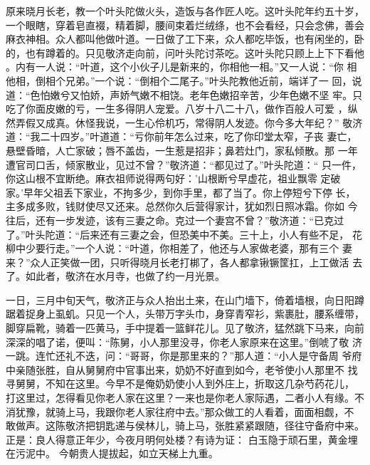原来晓月长老，教一个叶头陀做火头，造饭与各作匠人吃。这叶头陀年约五十岁，
一个眼瞎，穿着皂直裰，精着脚，腰间束着烂绒绦，也不会看经，只会念佛，善会
麻衣神相。众人都叫他做叶道。一日做了工下来，众人都吃毕饭，也有闲坐的，卧
的，也有蹲着的。只见敬济走向前，问叶头陀讨茶吃。这叶头陀只顾上上下下看他
。内有一人说：“叶道，这个小伙子儿是新来的，你相他一相。”又一人说：“你
相他相，倒相个兄弟。”一个说：“倒相个二尾子。”叶头陀教他近前，端详了一
回，说道：“色怕嫩兮又怕娇，声娇气嫩不相饶。老年色嫩招辛苦，少年色嫩不坚
牢。只吃了你面皮嫩的亏，一生多得阴人宠爱。八岁十八二十八，做作百般人可爱
，纵然弄假又成真。休怪我说，一生心伶机巧，常得阴人发迹。你今多大年纪？”
敬济道：“我二十四岁。”叶道道：“亏你前年怎么过来，吃了你印堂太窄，子丧
妻亡，悬壁昏暗，人亡家破；唇不盖齿，一生惹是招非；鼻若灶门，家私倾散。那
一年遭官司口舌，倾家散业，见过不曾？”敬济道：“都见过了。”叶头陀道：“
只一件，你这山根不宜断绝。麻衣祖师说得两句好：'山根断兮早虚花，祖业飘零
定破家。'早年父祖丢下家业，不拘多少，到你手里，都了当了。你上停短兮下停
长，主多成多败，钱财使尽又还来。总然你久后营得家计，犹如烈日照冰霜。你如
今往后，还有一步发迹，该有三妻之命。克过一个妻宫不曾？”敬济道：“已克过
了。”叶头陀道：“后来还有三妻之会，但恐美中不美。三十上，小人有些不足，
花柳中少要行走。”一个人说：“叶道，你相差了，他还与人家做老婆，那有三个
妻来？”众人正笑做一团，只听得晓月长老打梆了，各人都拿锹镢筐扛，上工做活
去了。如此者，敬济在水月寺，也做了约一月光景。

一日，三月中旬天气，敬济正与众人抬出土来，在山门墙下，倚着墙根，向日阳蹲
踞着捉身上虱虮。只见一个人，头带万字头巾，身穿青窄衫，紫裹肚，腰系缠带，
脚穿扁靴，骑着一匹黄马，手中提着一篮鲜花儿。见了敬济，猛然跳下马来，向前
深深的唱了诺，便叫：“陈舅，小人那里没寻，你老人家原来在这里。”倒唬了敬
济一跳。连忙还礼不迭，问：“哥哥，你是那里来的？”那人道：“小人是守备周
爷府中亲随张胜，自从舅舅府中官事出来，奶奶不好直到如今，老爷使小人那里不
找寻舅舅，不知在这里。今早不是俺奶奶使小人到外庄上，折取这几杂芍药花儿，
打这里过，怎得看见你老人家在这里？一来也是你老人家际遇，二者小人有缘。不
消犹豫，就骑上马，我跟你老人家往府中去。”那众做工的人看着，面面相觑，不
敢做声。这陈敬济把钥匙递与侯林儿，骑上马，张胜紧紧跟随，径往守备府中来。
正是：良人得意正年少，今夜月明何处楼？有诗为证：
白玉隐于顽石里，黄金埋在污泥中。
今朝贵人提拔起，如立天梯上九重。
